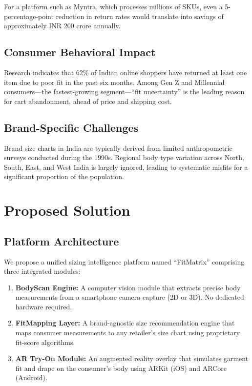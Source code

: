 \documentclass[12pt,a4paper]{article}
\begin{document}
For a platform such as Myntra, which processes millions of SKUs, even a 5-percentage-point reduction in return rates would translate into savings of approximately INR 200 crore annually.

\subsection{Consumer Behavioral Impact}

Research indicates that 62\% of Indian online shoppers have returned at least one item due to poor fit in the past six months. Among Gen Z and Millennial consumers---the fastest-growing segment---``fit uncertainty'' is the leading reason for cart abandonment, ahead of price and shipping cost.

\subsection{Brand-Specific Challenges}

Brand size charts in India are typically derived from limited anthropometric surveys conducted during the 1990s. Regional body type variation across North, South, East, and West India is largely ignored, leading to systematic misfits for a significant proportion of the population.

\section{Proposed Solution}

\subsection{Platform Architecture}

We propose a unified sizing intelligence platform named ``FitMatrix'' comprising three integrated modules:

\begin{enumerate}
    \item \textbf{BodyScan Engine:} A computer vision module that extracts precise body measurements from a smartphone camera capture (2D or 3D). No dedicated hardware required.
    \item \textbf{FitMapping Layer:} A brand-agnostic size recommendation engine that maps consumer measurements to any retailer's size chart using proprietary fit-score algorithms.
    \item \textbf{AR Try-On Module:} An augmented reality overlay that simulates garment fit and drape on the consumer's body using ARKit (iOS) and ARCore (Android).
\end{enumerate}
\end{document}
